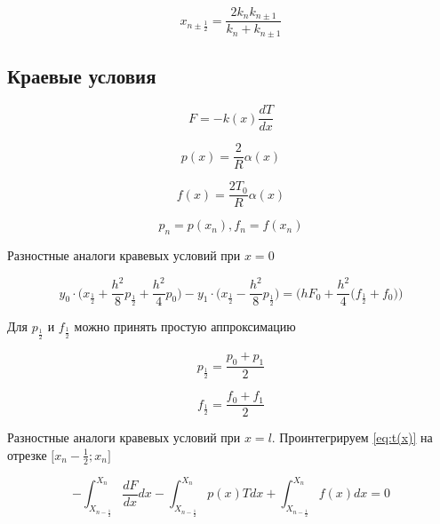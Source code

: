 \begin{equation*}
    x_{n \pm \frac{1}{2}} = \frac{2 k_n k_{n\pm1}}{k_n + k_{n\pm1}}
\end{equation*}

\subsection{Краевые условия}

\begin{equation*}
    F = -k(x)\frac{dT}{dx}
\end{equation*}

\begin{equation*}
    p(x) = \frac{2}{R} \alpha(x)
\end{equation*}

\begin{equation*}
    f(x) = \frac{2T_0}{R} \alpha(x)
\end{equation*}

\begin{equation*}
    p_n = p(x_n), f_n = f(x_n)
\end{equation*}

Разностные аналоги кравевых условий при $x = 0$

\begin{equation}\label{eq:left}
    y_0 \cdot \bigg( x_{\frac{1}{2}} + \frac{h^2}{8} p_{\frac{1}{2}} +
    \frac{h^2}{4}p_0 \bigg) - y_1 \cdot \bigg( x_{\frac{1}{2}} - \frac{h^2}{8}
    p_{\frac{1}{2}} \bigg) = \bigg( hF_0 + \frac{h^2}{4} \big(f_\frac{1}{2}+
    f_0 \big) \bigg)
\end{equation}

Для $p_\frac{1}{2}$ и $f_\frac{1}{2}$ можно принять простую аппроксимацию

\begin{equation*}
    p_\frac{1}{2} = \frac{p_0 + p_1}{2}
\end{equation*}

\begin{equation*}
    f_\frac{1}{2} = \frac{f_0 + f_1}{2}
\end{equation*}

Разностные аналоги кравевых условий при $x = l$. Проинтегрируем \ref{eq:t(x)} на отрезке $\big[ x_n-\frac{1}{2}; x_n \big]$

\begin{equation*}
    -\int_{X_{n-\frac{1}{2}}}^{X_n} \frac{dF}{dx} dx -
    \int_{X_{n-\frac{1}{2}}}^{X_n} p(x)T dx +
    \int_{X_{n-\frac{1}{2}}}^{X_n} f(x) dx = 0
\end{equation*}

